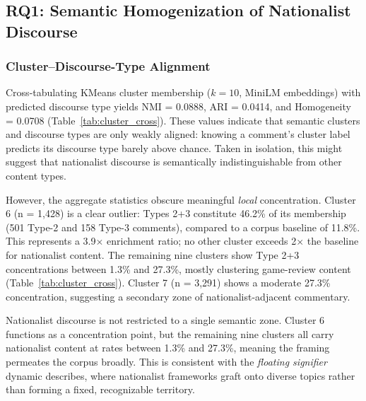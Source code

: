 \documentclass[man, 12pt, mask, floatsintext]{apa7}
\begin{document}
\subsection{RQ1: Semantic Homogenization of Nationalist Discourse}
\label{sec:rq1}

\subsubsection{Cluster--Discourse-Type Alignment}
Cross-tabulating KMeans cluster membership ($k=10$, MiniLM embeddings) with predicted discourse type yields NMI = 0.0888, ARI = 0.0414, and Homogeneity = 0.0708 (Table~\ref{tab:cluster_cross}). These values indicate that semantic clusters and discourse types are only weakly aligned: knowing a comment's cluster label predicts its discourse type barely above chance. Taken in isolation, this might suggest that nationalist discourse is semantically indistinguishable from other content types.

However, the aggregate statistics obscure meaningful \textit{local} concentration. Cluster 6 (n = 1,428) is a clear outlier: Types 2+3 constitute 46.2\% of its membership (501 Type-2 and 158 Type-3 comments), compared to a corpus baseline of 11.8\%. This represents a 3.9$\times$ enrichment ratio; no other cluster exceeds 2$\times$ the baseline for nationalist content. The remaining nine clusters show Type 2+3 concentrations between 1.3\% and 27.3\%, mostly clustering game-review content (Table~\ref{tab:cluster_cross}). Cluster 7 (n = 3,291) shows a moderate 27.3\% concentration, suggesting a secondary zone of nationalist-adjacent commentary.

Nationalist discourse is not restricted to a single semantic zone. Cluster 6 functions as a concentration point, but the remaining nine clusters all carry nationalist content at rates between 1.3\% and 27.3\%, meaning the framing permeates the corpus broadly. This is consistent with the \textit{floating signifier} dynamic \textcite{hall1996} describes, where nationalist frameworks graft onto diverse topics rather than forming a fixed, recognizable territory.
\end{document}
